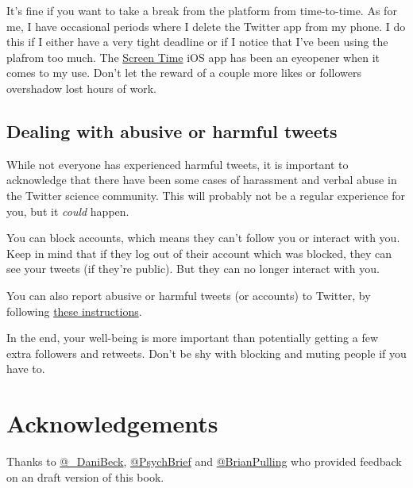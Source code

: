 \documentclass[]{book}
\begin{document}
It's fine if you want to take a break from the platform from time-to-time. As for me, I have occasional periods where I delete the Twitter app from my phone. I do this if I either have a very tight deadline or if I notice that I've been using the plafrom too much. The \href{https://support.apple.com/en-us/HT208982}{Screen Time} iOS app has been an eyeopener when it comes to my use. Don't let the reward of a couple more likes or followers overshadow lost hours of work.

\hypertarget{dealing-with-abusive-or-harmful-tweets}{%
\section{Dealing with abusive or harmful tweets}\label{dealing-with-abusive-or-harmful-tweets}}

While not everyone has experienced harmful tweets, it is important to acknowledge that there have been some cases of harassment and verbal abuse in the Twitter science community. This will probably not be a regular experience for you, but it \emph{could} happen.

You can block accounts, which means they can't follow you or interact with you. Keep in mind that if they log out of their account which was blocked, they can see your tweets (if they're public). But they can no longer interact with you.

You can also report abusive or harmful tweets (or accounts) to Twitter, by following \href{https://help.twitter.com/en/safety-and-security/report-abusive-behavior}{these instructions}.

In the end, your well-being is more important than potentially getting a few extra followers and retweets. Don't be shy with blocking and muting people if you have to.

\hypertarget{acknowledgements}{%
\chapter{Acknowledgements}\label{acknowledgements}}

Thanks to \href{https://twitter.com/_DaniBeck}{@\_DaniBeck}, \href{https://twitter.com/PsychBrief}{@PsychBrief} and \href{https://twitter.com/BrianPulling}{@BrianPulling} who provided feedback on an draft version of this book.


\end{document}

